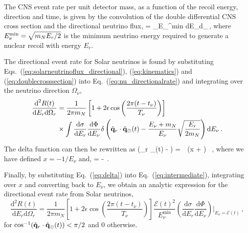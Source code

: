 \par The CNS event rate per unit detector mass, as a function of the recoil energy, direction and time, is given by the convolution of the double differential CNS cross section and the directional neutrino flux,
\be\label{eq:nu_directionalrate}
   =   \int_{E_\nu^{\rm min}} \times{} \textrm{d}E_\nu \textrm{d}\Omega_\nu \,,
\ee
where $E_\nu^{\rm min} = \sqrt{m_NE_r/2}$ is the minimum neutrino energy required to generate a nuclear recoil with energy $E_r$.

The directional event rate for Solar neutrinos is found by substituting Eqs.~(\ref{eq:solarneutrinoflux_directional}), (\ref{eq:kinematics}) and (\ref{eq:doublecrosssection}) into Eq.~(\ref{eq:nu_directionalrate}) and integrating over the neutrino direction $\Omega_\nu$,
\begin{align}
  \frac{\textrm{d}^2 R(t)}{\textrm{d}E_r \textrm{d}\Omega_r} &= \frac{1}{2\pi m_N}\left[ 1 + 2\epsilon\cos\left(\frac{2\pi(t- t_\nu)}{T_\nu}\right) \right]  \nonumber \\
&\times \int \frac{\textrm{d} \sigma}{\textrm{d}E_r}  \frac{\textrm{d} \Phi}{\textrm{d} E_\nu} \delta\left(\hat{{\bf q}}_r \cdot \hat{{\bf q}}_\odot(t) - \frac{E_\nu + m_N}{E_\nu} \sqrt{\frac{E_r}{2 m_N}}\right) \textrm{d}E_\nu \,.
\label{eq:intermediate}
\end{align}
The delta function can then be rewritten as
\be
  \delta\left(_r \cdot {}_\odot(t) -  \right) =   \, \,\delta \left(x + \right) \, ,
\label{eq:delta}
\ee
where we have defined $x = -1/E_\nu$ and,
\be
   =  -  \,.
\ee

Finally, by substituting Eq.~(\ref{eq:delta}) into Eq.~(\ref{eq:intermediate}), integrating over $x$ and converting back to $E_\nu$, we obtain an analytic expression for the directional event rate from Solar neutrinos,
\begin{equation}
  \frac{\textrm{d}^2 R(t)}{\textrm{d}E_r \textrm{d}\Omega_r} =  \frac{1}{2\pi m_N}\left[ 1 + 2\epsilon\cos\left(\frac{2\pi(t- t_\nu)}{T_\nu}\right) \right]  \frac{\mathcal{E}(t)^2}{ E_\nu^\textrm{min}} \left(\frac{\textrm{d} \sigma}{\textrm{d}E_r}\frac{\textrm{d} \Phi}{\textrm{d} E_\nu}\right)\bigg|_{E_\nu = \mathcal{E}(t)} \,,
\label{eq:solarnu}
\end{equation}
for $\cos^{-1}(\hat{{\bf q}}_r \cdot \hat{{\bf q}}_\odot(t)) < \pi/2$ and 0 otherwise.

